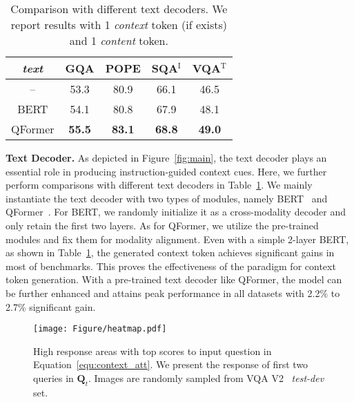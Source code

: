 \begin{table}[t]
 \centering
\begin{tabular}{c|cccc}
  \toprule
  {\em text} & {\bf GQA}  & {\bf POPE} & {\bf SQA$^\text{I}$} & {\bf VQA$^\text{T}$} \\
  \midrule
  -- & 53.3  & 80.9 & 66.1 & 46.5 \\
  BERT & 54.1 & 80.8 & 67.9 & 48.1 \\
  \rowcolor{mygray}
  QFormer & {\bf 55.5} & {\bf 83.1} & {\bf 68.8} & {\bf 49.0} \\
  \bottomrule
\end{tabular}
  \caption{Comparison with different text decoders.
We report results with 1 {\em context} token (if exists) and 1 {\em content} token.
 }
 \label{tab:abla_text_vis}
\end{table}

\vspace{1.0em}
\noindent
\textbf{Text Decoder.}
As depicted in Figure~\ref{fig:main}, the text decoder plays an essential role in producing instruction-guided context cues.
Here, we further perform comparisons with different text decoders in Table~\ref{tab:abla_text_vis}.
We mainly instantiate the text decoder with two types of modules, namely BERT~\cite{devlin2018bert} and QFormer~\cite{instructblip}.
For BERT, we randomly initialize it as a cross-modality decoder and only retain the first two layers.
As for QFormer, we utilize the pre-trained modules and fix them for modality alignment.
Even with a simple 2-layer BERT, as shown in Table~\ref{tab:abla_text_vis}, the generated context token achieves significant gains in most of benchmarks.
This proves the effectiveness of the paradigm for context token generation.
With a pre-trained text decoder like QFormer, the model can be further enhanced and attains peak performance in all datasets with 2.2\% to 2.7\% significant gain.

\begin{figure}[t!]
\centering
\texttt{[image: Figure/heatmap.pdf]} 
\caption{
High response areas with top scores to input question in Equation~\ref{equ:context_att}.
We present the response of first two queries in ${\mathbf Q}_t$.
Images are randomly sampled from VQA V2~\cite{vqav2} {\em test-dev} set.
}
\label{fig:heatmap}
\end{figure}

